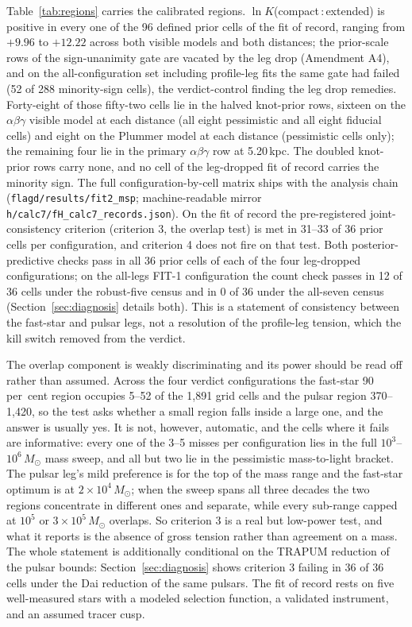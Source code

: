 \documentclass[11pt]{article}
\newcommand{\msun}{\ensuremath{M_\odot}}
\newcommand{\lnK}{\ensuremath{\ln K}}
\begin{document}
Table~\ref{tab:regions} carries the calibrated regions. $\lnK$(compact\,:\,extended) is positive in every one of the 96 defined prior cells of the fit of record, ranging from $+9.96$ to $+12.22$ across both visible models and both distances; the prior-scale rows of the sign-unanimity gate are vacated by the leg drop (Amendment A4), and on the all-configuration set including profile-leg fits the same gate had failed (52 of 288 minority-sign cells), the verdict-control finding the leg drop remedies. Forty-eight of those fifty-two cells lie in the halved knot-prior rows, sixteen on the $\alpha\beta\gamma$ visible model at each distance (all eight pessimistic and all eight fiducial cells) and eight on the Plummer model at each distance (pessimistic cells only); the remaining four lie in the primary $\alpha\beta\gamma$ row at 5.20\,kpc. The doubled knot-prior rows carry none, and no cell of the leg-dropped fit of record carries the minority sign. The full configuration-by-cell matrix ships with the analysis chain (\texttt{flagd/results/fit2\_msp}; machine-readable mirror \texttt{h/calc7/fH\_calc7\_records.json}). On the fit of record the pre-registered joint-consistency criterion (criterion 3, the overlap test) is met in 31--33 of 36 prior cells per configuration, and criterion 4 does not fire on that test. Both posterior-predictive checks pass in all 36 prior cells of each of the four leg-dropped configurations; on the all-legs FIT-1 configuration the count check passes in 12 of 36 cells under the robust-five census and in 0 of 36 under the all-seven census (Section~\ref{sec:diagnosis} details both). This is a statement of consistency between the fast-star and pulsar legs, not a resolution of the profile-leg tension, which the kill switch removed from the verdict.

The overlap component is weakly discriminating and its power should be read off rather than assumed. Across the four verdict configurations the fast-star 90\,per~cent region occupies 5--52 of the 1{,}891 grid cells and the pulsar region 370--1{,}420, so the test asks whether a small region falls inside a large one, and the answer is usually yes. It is not, however, automatic, and the cells where it fails are informative: every one of the 3--5 misses per configuration lies in the full $10^{3}$--$10^{6}\,\msun$ mass sweep, and all but two lie in the pessimistic mass-to-light bracket. The pulsar leg's mild preference is for the top of the mass range and the fast-star optimum is at $2\times10^{4}\,\msun$; when the sweep spans all three decades the two regions concentrate in different ones and separate, while every sub-range capped at $10^{5}$ or $3\times10^{5}\,\msun$ overlaps. So criterion 3 is a real but low-power test, and what it reports is the absence of gross tension rather than agreement on a mass. The whole statement is additionally conditional on the TRAPUM reduction of the pulsar bounds: Section~\ref{sec:diagnosis} shows criterion 3 failing in 36 of 36 cells under the Dai reduction of the same pulsars. The fit of record rests on five well-measured stars with a modeled selection function, a validated instrument, and an assumed tracer cusp.
\end{document}
